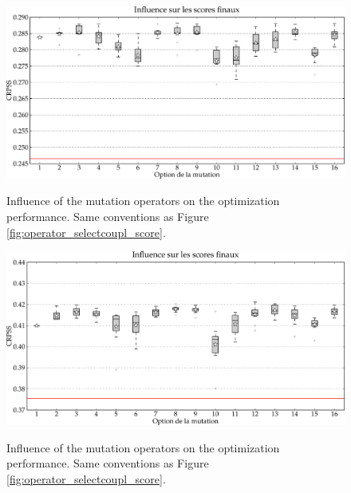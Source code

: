 \documentclass[twocol]{ametsoc}
\begin{document}
\begin{figure}[htb]
	\begin{center}
		\noindent\includegraphics[width=14cm,angle=0]{figures/operator_mutation_score_rhoneamont.pdf}\\
	\end{center}
	\caption{Influence of the mutation operators on the optimization performance. Same conventions as Figure \ref{fig:operator_selectcoupl_score}.}
	\label{fig:operator_mutation_score_rhoneamont}
\end{figure}

\begin{figure}[htb]
	\begin{center}
		\noindent\includegraphics[width=14cm,angle=0]{figures/operator_mutation_score_r2.pdf}\\
	\end{center}
	\caption{Influence of the mutation operators on the optimization performance. Same conventions as Figure \ref{fig:operator_selectcoupl_score}.}
	\label{fig:operator_mutation_score_r2}
\end{figure}
\end{document}
